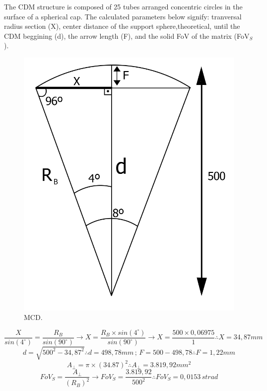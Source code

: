 \documentclass[a4paper,12pt]{article}
\begin{document}
The CDM structure is composed of 25 tubes arranged  concentric circles in the surface of a spherical cap. The  calculated parameters below signify: tranversal radius section (X), center distance of the support sphere,theoretical, until the  CDM beggining (d), the arrow length (F), and the solid FoV of the matrix (FoV$_{S}$).
\begin{figure}[htb] 
	\centering
	\includegraphics[scale=0.25]{MCD_2.jpg}
	\caption{MCD.}
\end{figure}
$$ \frac{X}{sin(4^{\circ})} = \frac{R_{B}}{sin(90^{\circ})}\longrightarrow X= \frac{R_{B}\times sin(4^{\circ})}{sin(90^{\circ})} \longrightarrow X=\frac{500\times 0,06975}{1} \therefore X=34,87mm $$
$$d = \sqrt{500^{2} - 34,87^{2}} \therefore d=498,78mm \, ;\, F=500-498,78 \therefore F=1,22mm $$
$$ A_{\bot } = \pi\times(34.87)^{2} \therefore A_{\bot } = 3.819,92mm^{2} $$ 
$$ FoV_{S} = \frac{A_{\bot }}{(R_{B})^{2}} \longrightarrow FoV_{S} =\frac{3.819,92}{500^{2}} \therefore FoV_{S} = 0,0153 \, strad$$ 
\end{document}
